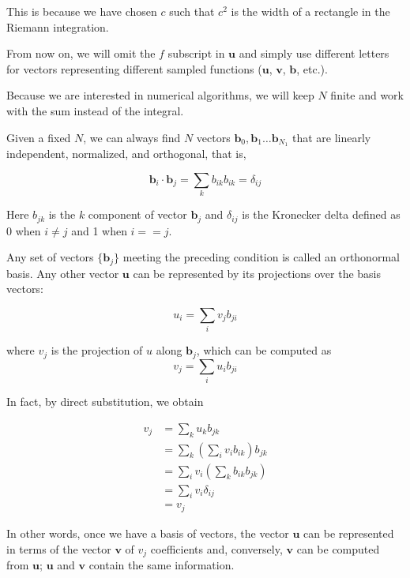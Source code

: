 \documentclass[justified,sixbynine]{tufte-book}
\theoremstyle{plain}%
\theoremstyle{definition}
\theoremstyle{remark}
\begin{document}
\begin{fullwidth}
This is because we have chosen $c$ such that $c^2$ is the width of a rectangle in the Riemann integration.

From now on, we will omit the $f$ subscript in $\mathbf{u}$ and simply use different letters for vectors representing different sampled functions ($\mathbf{u}$, $\mathbf{v}$, $\mathbf{b}$, etc.).

Because we are interested in numerical algorithms, we will keep $N$ finite and work with the sum instead of the integral.

Given a fixed $N$, we can always find $N$ vectors $\mathbf{b}_0,\mathbf{b}_1\dots\mathbf{b}_{N_1}$ that are linearly independent, normalized, and orthogonal, that is,

\begin{equation}
\mathbf{b}_i \cdot \mathbf{b}_j = \sum_k b_{ik} b_{ik} = \delta_{ij}
\end{equation}

Here $b_{jk}$ is the $k$ component of vector $\mathbf{b}_j$ and $\delta_{ij}$ is the Kronecker delta defined as 0 when $i\neq j$ and 1 when $i==j$.

Any set of vectors $\{\mathbf{b}_j\}$ meeting the preceding condition is called an orthonormal basis. Any other vector $\mathbf{u}$ can be represented by its projections over the basis vectors:

\begin{equation}
  u_i = \sum_i v_j b_{ji}
\end{equation}

where $v_j$ is the projection of $u$ along $\mathbf{b}_j$, which can be computed as
\begin{equation}
  v_j = \sum_i u_i b_{ji}
\end{equation}

In fact, by direct substitution, we obtain

\begin{align}
  v_j &= \sum_k u_k b_{jk} \\
      &= \sum_k (\sum_i v_i b_{ik}) b_{jk} \\
      &= \sum_i v_i (\sum_k b_{ik} b_{jk}) \\
      &= \sum_i v_i \delta_{ij} \\
      &= v_j
\end{align}

In other words, once we have a basis of vectors, the vector $\mathbf{u}$ can be represented in terms of the vector $\mathbf{v}$ of $v_j$ coefficients and, conversely, $\mathbf{v}$ can be computed from $\mathbf{u}$; $\mathbf{u}$ and $\mathbf{v}$ contain the same information.


\end{fullwidth}
\end{document}
